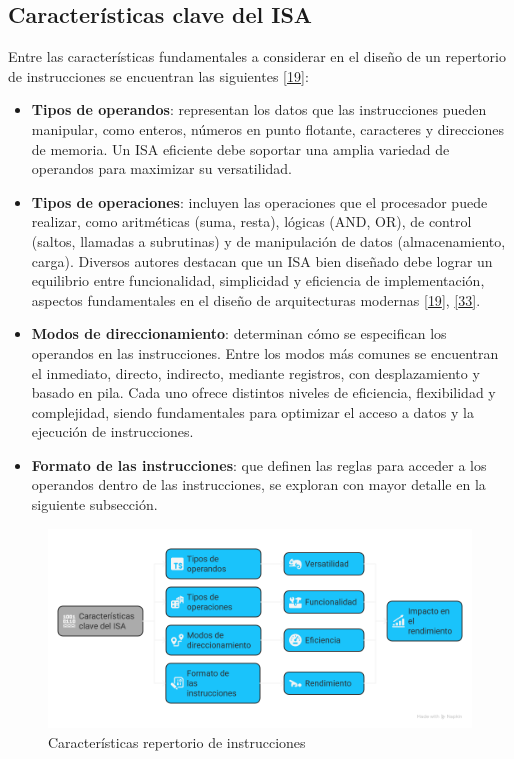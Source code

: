 \documentclass[12pt,oneside]{templates/unerthesis}
\providecommand{\tightlist}{%
  \setlength{\itemsep}{0pt}\setlength{\parskip}{0pt}}
\begin{document}
\hypertarget{caracteruxedsticas-clave-del-isa}{%
\subsection{Características clave del ISA}\label{caracteruxedsticas-clave-del-isa}}

Entre las características fundamentales a considerar en el diseño de un repertorio de instrucciones se encuentran las siguientes \protect\hyperlink{ref-hennessy2017computer}{{[}19{]}}:

\begin{itemize}
\tightlist
\item
  \textbf{Tipos de operandos}: representan los datos que las instrucciones pueden manipular, como enteros, números en punto flotante, caracteres y direcciones de memoria. Un ISA eficiente debe soportar una amplia variedad de operandos para maximizar su versatilidad.
\item
  \textbf{Tipos de operaciones}: incluyen las operaciones que el procesador puede realizar, como aritméticas (suma, resta), lógicas (AND, OR), de control (saltos, llamadas a subrutinas) y de manipulación de datos (almacenamiento, carga). Diversos autores destacan que un ISA bien diseñado debe lograr un equilibrio entre funcionalidad, simplicidad y eficiencia de implementación, aspectos fundamentales en el diseño de arquitecturas modernas \protect\hyperlink{ref-hennessy2017computer}{{[}19{]}}, \protect\hyperlink{ref-null_essentials_2023}{{[}33{]}}.
\item
  \textbf{Modos de direccionamiento}: determinan cómo se especifican los operandos en las instrucciones. Entre los modos más comunes se encuentran el inmediato, directo, indirecto, mediante registros, con desplazamiento y basado en pila. Cada uno ofrece distintos niveles de eficiencia, flexibilidad y complejidad, siendo fundamentales para optimizar el acceso a datos y la ejecución de instrucciones.
\item
  \textbf{Formato de las instrucciones}: que definen las reglas para acceder a los operandos dentro de las instrucciones, se exploran con mayor detalle en la siguiente subsección.
\end{itemize}

\begin{figure}

{\centering \includegraphics[width=1\linewidth]{images/isa} 

}

\caption{Características repertorio de instrucciones}\label{fig:repInstCaracteristicas}
\end{figure}
\end{document}
